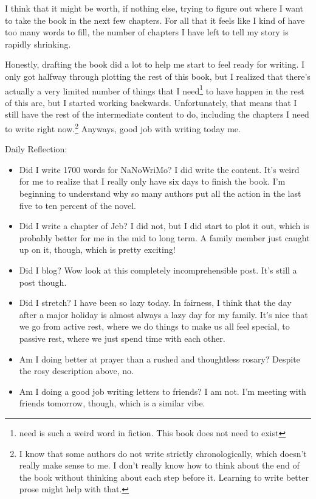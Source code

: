 \documentclass[12pt]{article}[titlepage]
\newcommand{\1}{\={a}}
\newcommand{\2}{\={e}}
\newcommand{\3}{\={\i}}
\newcommand{\4}{\=o}
\newcommand{\5}{\=u}
\newcommand{\6}{\={A}}
\renewcommand{\,}{\textsuperscript{,}}
\begin{document}
I think that it might be worth, if nothing else, trying to figure out where I want to take the book in the next few chapters.
For all that it feels like I kind of have too many words to fill, the number of chapters I have left to tell my story is rapidly shrinking.

Honestly, drafting the book did a lot to help me start to feel ready for writing.
I only got halfway through plotting the rest of this book, but I realized that there's actually a very limited number of things that I need\footnote{need is such a weird word in fiction.
This book does not need to exist} to have happen in the rest of this arc, but I started working backwards.
Unfortunately, that means that I still have the rest of the intermediate content to do, including the chapters I need to write right now.\footnote{I know that some authors do not write strictly chronologically, which doesn't really make sense to me. I don't really know how to think about the end of the book without thinking about each step before it. Learning to write better prose might help with that.}
Anyways, good job with writing today me.

Daily Reflection:
\begin{itemize}
\item Did I write 1700 words for NaNoWriMo? I did write the content. It's weird for me to realize that I really only have six days to finish the book. I'm beginning to understand why so many authors put all the action in the last five to ten percent of the novel.
\item Did I write a chapter of Jeb? I did not, but I did start to plot it out, which is probably better for me in the mid to long term. A family member just caught up on it, though, which is pretty exciting!
\item Did I blog? Wow look at this completely incomprehensible post. It's still a post though.
\item Did I stretch? I have been so lazy today. In fairness, I think that the day after a major holiday is almost always a lazy day for my family. It's nice that we go from active rest, where we do things to make us all feel special, to passive rest, where we just spend time with each other.
\item Am I doing better at prayer than a rushed and thoughtless rosary? Despite the rosy description above, no.
\item Am I doing a good job writing letters to friends? I am not. I'm meeting with friends tomorrow, though, which is a similar vibe.
\end{itemize}
\end{document}
